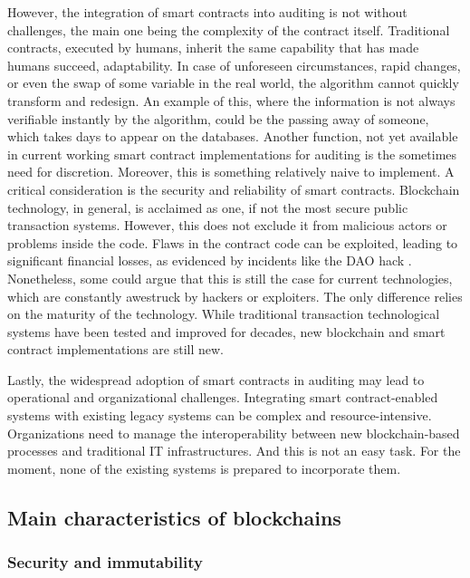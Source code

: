 However, the integration of smart contracts into auditing is not without challenges, the main one being the complexity of the contract itself. Traditional contracts, executed by humans, inherit the same capability that has made humans succeed, adaptability. In case of unforeseen circumstances, rapid changes, or even the swap of some variable in the real world, the algorithm cannot quickly transform and redesign. An example of this, where the information is not always verifiable instantly by the algorithm, could be the passing away of someone, which takes days to appear on the databases. Another function, not yet available in current working smart contract implementations for auditing is the sometimes need for discretion. Moreover, this is something relatively naive to implement. 
A critical consideration is the security and reliability of smart contracts. Blockchain technology, in general, is acclaimed as one, if not the most secure public transaction systems. However, this does not exclude it from malicious actors or problems inside the code. Flaws in the contract code can be exploited, leading to significant financial losses, as evidenced by incidents like the DAO hack \cite{DAOhack}. Nonetheless, some could argue that this is still the case for current technologies, which are constantly awestruck by hackers or exploiters. The only difference relies on the maturity of the technology. While traditional transaction technological systems have been tested and improved for decades, new blockchain and smart contract implementations are still new. 

Lastly, the widespread adoption of smart contracts in auditing may lead to operational and organizational challenges. Integrating smart contract-enabled systems with existing legacy systems can be complex and resource-intensive. Organizations need to manage the interoperability between new blockchain-based processes and traditional IT infrastructures. And this is not an easy task. For the moment, none of the existing systems is prepared to incorporate them.

\subsection{Main characteristics of blockchains}

\subsubsection{Security and immutability}

